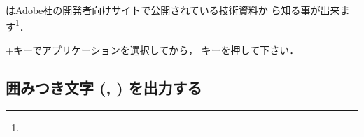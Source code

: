 \begin{usage}
\end{usage}
はAdobe社の開発者向けサイトで公開されている技術資料か
ら知る事が出来ます\footnote{\webAdobeJapanList}．






\begin{inout}
+キーでアプリケーションを選択してから，
キーを押して下さい．
\end{inout}



\subsection{囲みつき文字 (\protect{}, \protect{}) を出力する}


